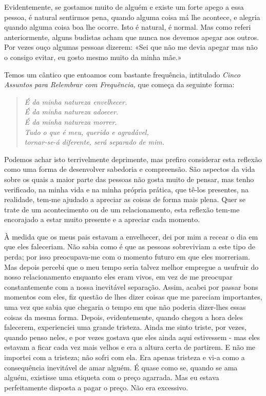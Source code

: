 Evidentemente, se gostamos muito de alguém e existe um forte apego a
essa pessoa, é natural sentirmos pena, quando alguma coisa má lhe
acontece, e alegria quando alguma coisa boa lhe ocorre. Isto é natural,
é normal. Mas como referi anteriormente, alguns budistas acham que nunca
nos devemos apegar aos outros. Por vezes ouço algumas pessoas dizerem:
«Sei que não me devia apegar mas não o consigo evitar, eu gosto mesmo
muito da minha mãe.»

Temos um cântico que entoamos com bastante frequência, intitulado
\emph{Cinco Assuntos para Relembrar com Frequência,} que começa da
seguinte forma:

\begin{quote}
\itshape
É da minha natureza envelhecer.\\
É da minha natureza adoecer.\\
É da minha natureza morrer.\\
Tudo o que é meu, querido e agradável,\\
tornar-se-á diferente, será separado de mim.
\end{quote}

Podemos achar isto terrivelmente deprimente, mas prefiro considerar esta
reflexão como uma forma de desenvolver sabedoria e compreensão. São
aspectos da vida sobre os quais a maior parte das pessoas não gosta
muito de pensar, mas tenho verificado, na minha vida e na minha própria
prática, que tê-los presentes, na realidade, tem-me ajudado a apreciar
as coisas de forma mais plena. Quer se trate de um acontecimento ou de
um relacionamento, esta reflexão tem-me encorajado a estar muito
presente e a apreciar cada momento.

À medida que os meus pais estavam a envelhecer, dei por mim a recear o
dia em que eles faleceriam. Não sabia como é que as pessoas sobreviviam
a este tipo de perda; por isso preocupava-me com o momento futuro em que
eles morreriam. Mas depois percebi que o meu tempo seria talvez melhor
empregue a usufruir do nosso relacionamento enquanto eles eram vivos, em
vez de me preocupar constantemente com a nossa inevitável separação.
Assim, acabei por passar bons momentos com eles, fiz questão de lhes
dizer coisas que me pareciam importantes, uma vez que sabia que chegaria
o tempo em que não poderia dizer-lhes essas coisas da mesma forma.
Depois, evidentemente, quando chegou a hora deles falecerem,
experienciei uma grande tristeza. Ainda me sinto triste, por vezes,
quando penso neles, e por vezes gostava que eles ainda aqui estivessem -
mas eles estavam a ficar cada vez mais velhos e era a altura certa de
partirem. E não me importei com a tristeza; não sofri com ela. Era
apenas tristeza e vi-a como a consequência inevitável de amar alguém. É
quase como se, quando se ama alguém, existisse uma etiqueta com o preço
agarrada. Mas eu estava perfeitamente disposta a pagar o preço. Não era
excessivo.

